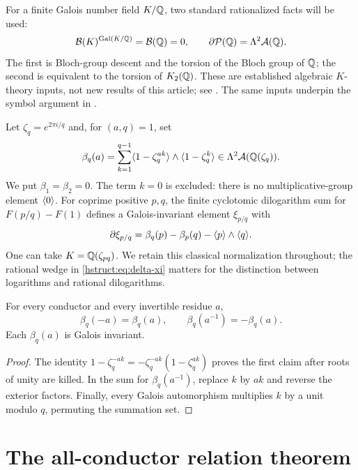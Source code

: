 For a finite Galois number field $K/\mathbb{Q}$, two standard rationalized facts
will be used:
\begin{equation}\label{hstruct:eq:bloch-facts}
 \mathcal B(K)^{\operatorname{Gal}(K/\mathbb{Q})}=\mathcal B(\mathbb{Q})=0,
 \qquad \partial\mathcal P(\mathbb{Q})=\Lambda^2\mathcal A(\mathbb{Q}).
\end{equation}
The first is Bloch-group descent and the torsion of the Bloch group of
$\mathbb{Q}$; the second is equivalent to the torsion of $K_2(\mathbb{Q})$.
These are established algebraic $K$-theory inputs, not new results of this
article; see \cite{hstruct:Milnor,hstruct:ZagierDilog}. The same inputs underpin the
symbol argument in \cite[\S7.2]{RadchenkoZagier}.

Let $\zeta_q=e^{2\pi i/q}$ and, for $(a,q)=1$, set
\begin{equation}\label{hstruct:eq:beta}
 \beta_q(a)=\sum_{k=1}^{q-1}
 \langle 1-\zeta_q^{ak}\rangle\wedge\langle 1-\zeta_q^k\rangle
 \in\Lambda^2\mathcal A(\mathbb{Q}(\zeta_q)).
\end{equation}
We put $\beta_1=\beta_2=0$. The term $k=0$ is excluded:
there is no multiplicative-group element $\langle 0\rangle$.
For coprime positive $p,q$, the finite cyclotomic dilogarithm sum for
$F(p/q)-F(1)$ defines a Galois-invariant element $\xi_{p/q}$ with
\begin{equation}\label{hstruct:eq:delta-xi}
 \partial\xi_{p/q}=\beta_q(p)-\beta_p(q)-\langle p\rangle\wedge\langle q\rangle.
\end{equation}
One can take $K=\mathbb{Q}(\zeta_{pq})$. We retain this classical normalization
throughout; the rational wedge in \eqref{hstruct:eq:delta-xi} matters for the
distinction between logarithms and rational dilogarithms.

\begin{lemma}\label{hstruct:lem:symmetry}
For every conductor and every invertible residue $a$,
\[
 \beta_q(-a)=\beta_q(a),\qquad
 \beta_q(a^{-1})=-\beta_q(a).
\]
Each $\beta_q(a)$ is Galois invariant.
\end{lemma}
\begin{proof}
The identity $1-\zeta_q^{-ak}=-\zeta_q^{-ak}(1-\zeta_q^{ak})$
proves the first claim after roots of unity are killed. In the sum for
$\beta_q(a^{-1})$, replace $k$ by $ak$ and reverse the exterior factors.
Finally, every Galois automorphism multiplies $k$ by a unit modulo $q$,
permuting the summation set.
\end{proof}

\section{The all-conductor relation theorem}
\label{hstruct:sec:rank}

